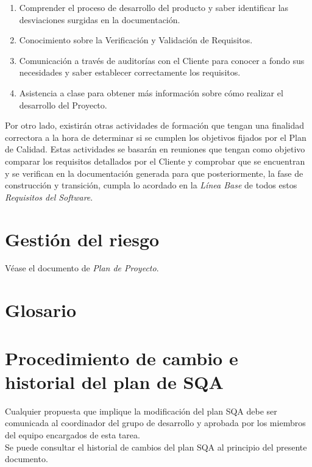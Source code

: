 \documentclass[11pt, a4paper, twoside, titlepage]{article}
\begin{document}
		\begin{enumerate}
			\item Comprender el proceso de desarrollo del producto y saber identificar las desviaciones surgidas en la documentación.
			\item Conocimiento sobre la Verificación y Validación de Requisitos.
			\item Comunicación a través de auditorías con el Cliente para conocer a fondo sus necesidades y saber establecer correctamente
los requisitos.
			\item Asistencia a clase para obtener más información sobre cómo realizar el desarrollo del Proyecto.
		\end{enumerate}
	Por otro lado, existirán otras actividades de formación que tengan una finalidad correctora a la hora de determinar si se cumplen los objetivos fijados por el Plan de Calidad. Estas actividades se basarán en reuniones que tengan como objetivo comparar los requisitos detallados por el Cliente y comprobar que se encuentran y se verifican en la documentación generada para que posteriormente, la fase de construcción y transición, cumpla lo acordado en la \textit{Línea Base }de todos estos \textit{Requisitos del Software}.
		
	\section{Gestión del riesgo}
		Véase el documento de \textit{Plan de Proyecto}.

	\section{Glosario}
		\printglossaries

	\section{Procedimiento de cambio e historial del plan de SQA} %
		Cualquier propuesta que implique la modificación del plan SQA debe ser comunicada al coordinador del grupo de desarrollo y aprobada por los miembros del equipo encargados de esta tarea.\\

		Se puede consultar el historial de cambios del plan SQA al principio del presente documento.

	\appendix
	\newpage
	
	
\end{document}
